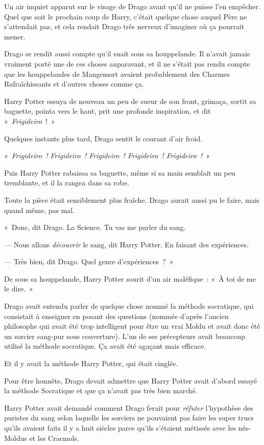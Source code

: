 Un air inquiet apparut sur le visage de Drago avant qu'il ne puisse l'en empêcher. Quel que soit le prochain coup de Harry, c'était quelque chose auquel Père ne s'attendait pas, et cela rendait Drago très nerveux d'imaginer où ça pourrait mener.

Drago se rendit aussi compte qu'il suait sous sa houppelande. Il n'avait jamais vraiment porté une de ces choses auparavant, et il ne s'était pas rendu compte que les houppelandes de Mangemort avaient probablement des Charmes Rafraîchissants et d'autres choses comme ça.

Harry Potter essuya de nouveau un peu de sueur de son front, grimaça, sortit sa baguette, pointa vers le haut, prit une profonde inspiration, et dit «~\emph{Frigideiro}~!~»

Quelques instants plus tard, Drago sentit le courant d'air froid.

«~\emph{Frigideiro~! Frigideiro~! Frigideiro~! Frigideiro~! Frigideiro~!}~»

Puis Harry Potter rabaissa sa baguette, même si sa main semblait un peu tremblante, et il la rangea dans sa robe.

Toute la pièce était sensiblement plus fraîche. Drago aurait aussi pu le faire, mais quand même, pas mal.

«~Donc, dit Drago. La Science. Tu vas me parler du sang.

--- Nous allons \emph{découvrir} le sang, dit Harry Potter. En faisant des expériences.

--- Très bien, dit Drago. Quel genre d'expériences~?~»

De sous sa houppelande, Harry Potter sourit d'un air maléfique~: «~À toi de me le dire.~»

\later

Drago avait entendu parler de quelque chose nommé la méthode socratique, qui consistait à enseigner en posant des questions (nommée d'après l'ancien philosophe qui avait été trop intelligent pour être un vrai Moldu et avait donc été un sorcier sang-pur sous couverture). L'un de ses précepteurs avait beaucoup utilisé la méthode socratique. Ça avait été agaçant mais efficace.

Et il y avait la méthode Harry Potter, qui était cinglée.

Pour être honnête, Drago devait admettre que Harry Potter avait d'abord essayé la méthode Socratique et que ça n'avait pas très bien marché.

Harry Potter avait demandé comment Drago ferait pour \emph{réfuter} l'hypothèse des puristes du sang selon laquelle les sorciers ne pouvaient pas faire les super trucs qu'ils avaient faits il y a huit siècles parce qu'ils s'étaient métissés avec les nés-Moldus et les Cracmols.

